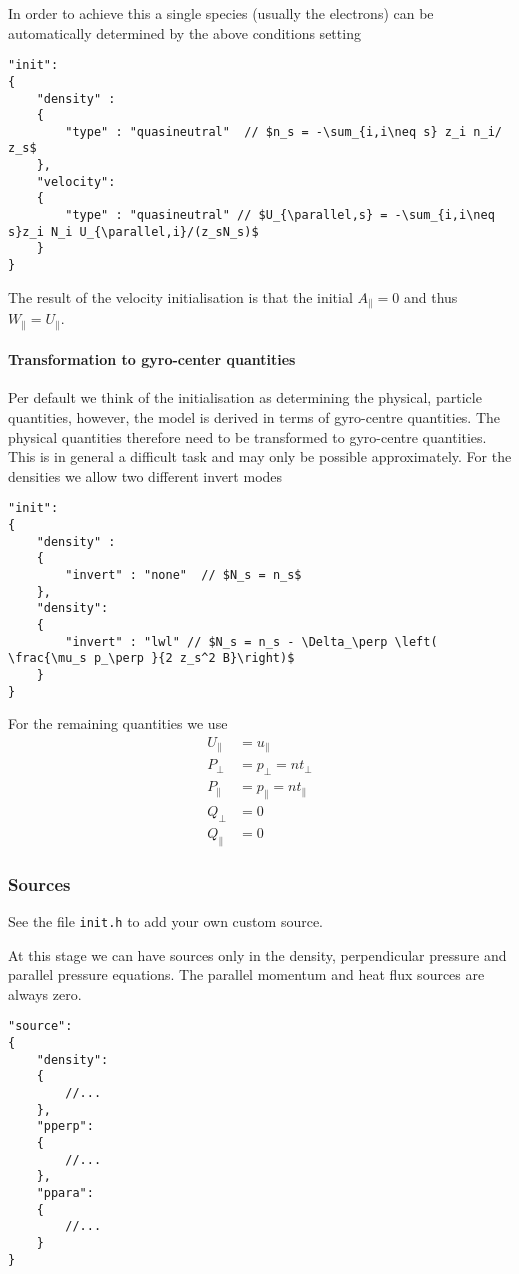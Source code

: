 In order to achieve this a single species (usually the electrons) can be automatically determined by the
above conditions setting
\begin{verbatim}
"init":
{
    "density" :
    {
        "type" : "quasineutral"  // $n_s = -\sum_{i,i\neq s} z_i n_i/ z_s$
    },
    "velocity":
    {
        "type" : "quasineutral" // $U_{\parallel,s} = -\sum_{i,i\neq s}z_i N_i U_{\parallel,i}/(z_sN_s)$
    }
}
\end{verbatim}
The result of the velocity initialisation is that the initial $A_\parallel=0$ and thus $W_\parallel = U_\parallel$.


\paragraph{Transformation to gyro-center quantities}
Per default we think of the initialisation as determining the physical, particle quantities, however, the
model is derived in terms of gyro-centre quantities.
The physical quantities therefore need to be transformed to gyro-centre quantities. This is in general a
difficult task and may only be possible approximately.
For the densities we allow two different invert modes
\begin{verbatim}
"init":
{
    "density" :
    {
        "invert" : "none"  // $N_s = n_s$
    },
    "density":
    {
        "invert" : "lwl" // $N_s = n_s - \Delta_\perp \left( \frac{\mu_s p_\perp }{2 z_s^2 B}\right)$
    }
}
\end{verbatim}
For the remaining quantities we use
\begin{align}
U_\parallel &= u_\parallel\\
P_\perp &= p_\perp = n t_\perp \\
P_\parallel &= p_\parallel = n t_\parallel\\
Q_\perp &= 0 \\
Q_\parallel &= 0
\end{align}


\subsubsection{Sources} \label{sec:sources}
See the file {\tt init.h} to add your own custom source.

At this stage we can have sources only in the density, perpendicular pressure and
parallel pressure equations. The parallel momentum and heat flux sources are always zero.
\begin{verbatim}
"source":
{
    "density":
    {
        //...
    },
    "pperp":
    {
        //...
    },
    "ppara":
    {
        //...
    }
}
\end{verbatim}


